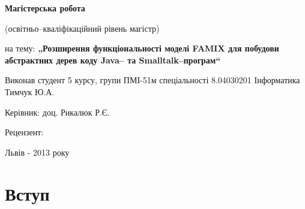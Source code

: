 \documentclass[12pt,a4paper]{article}
\begin{document}

\pagestyle{empty}
\setlength{\parindent}{1.5cm}
\fontsize{14pt}{6mm}\selectfont

\begin{center}

  \vspace{6cm}


    {\bfseries\Large Магістерська робота}

    {\small (освітньо--кваліфікаційний рівень магістр)}
    
    \bigskip   
    
    на тему: {\bfseries\large „Розширення функціональності моделі FAMIX для побудови абстрактних дерев коду Java-- та Smalltalk--програм“}

\end{center}

\vspace{2cm}

\begin{small}
\begin{flushleft}
  Виконав студент 5 курсу, групи ПМІ-51м спеціальності 8.04030201 Інформатика\\
  Тимчук Ю.А.\linebreak
  
  Керівник: доц. Рикалюк Р.Є.\linebreak
  
  Рецензент:   
  
\end{flushleft}
\end{small}

\vspace{5cm}

\begin{center}
  Львів - 2013 року
\end{center}

\clearpage



\fontsize{14pt}{6mm}\selectfont

\tableofcontents
\clearpage
\pagestyle{plain}
\section{Вступ}
\end{document}
